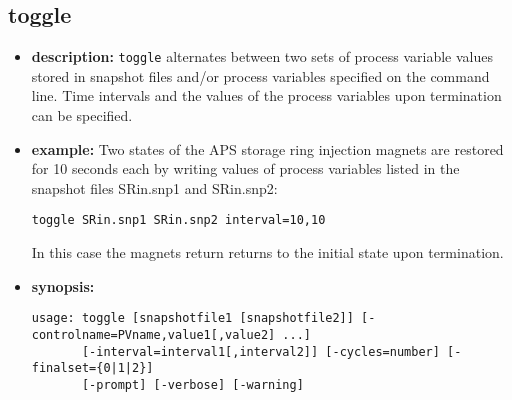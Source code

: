 %
%
\begin{latexonly}
\newpage
\end{latexonly}

%
%
\subsection{toggle}
\label{toggle}

\begin{itemize}
\item {\bf description:}
%
%
\verb+toggle+ alternates between two sets of process variable values stored in 
snapshot files and/or
process variables specified on the command line.
Time intervals and the values of the process variables upon termination can be specified.
\item {\bf example:} 
%
% 
%
Two states of the APS storage ring injection magnets are restored for 10 seconds each by writing 
values of process variables listed in the snapshot files SRin.snp1 and SRin.snp2:
\begin{verbatim}
toggle SRin.snp1 SRin.snp2 interval=10,10
\end{verbatim}
In this case the magnets return returns to the initial state upon termination.

\item {\bf synopsis:} 
%
%
\begin{verbatim}
usage: toggle [snapshotfile1 [snapshotfile2]] [-controlname=PVname,value1[,value2] ...]
       [-interval=interval1[,interval2]] [-cycles=number] [-finalset={0|1|2}]
       [-prompt] [-verbose] [-warning]
\end{verbatim}


\end{itemize}
